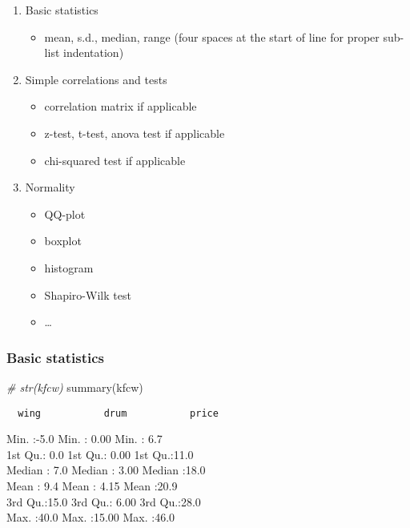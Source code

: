 \documentclass[
]{article}
\newenvironment{Shaded}{\begin{snugshade}}{\end{snugshade}}
\newcommand{\CommentTok}[1]{\textcolor[rgb]{0.56,0.35,0.01}{\textit{#1}}}
\newcommand{\FunctionTok}[1]{\textcolor[rgb]{0.00,0.00,0.00}{#1}}
\newcommand{\NormalTok}[1]{#1}
\providecommand{\tightlist}{%
  \setlength{\itemsep}{0pt}\setlength{\parskip}{0pt}}
\begin{document}
\begin{enumerate}
\def\labelenumi{\arabic{enumi}.}
\tightlist
\item
  Basic statistics

  \begin{itemize}
  \tightlist
  \item
    mean, s.d., median, range (four spaces at the start of line for
    proper sub-list indentation)
  \end{itemize}
\item
  Simple correlations and tests

  \begin{itemize}
  \tightlist
  \item
    correlation matrix if applicable
  \item
    z-test, t-test, anova test if applicable
  \item
    chi-squared test if applicable
  \end{itemize}
\item
  Normality

  \begin{itemize}
  \tightlist
  \item
    QQ-plot
  \item
    boxplot
  \item
    histogram
  \item
    Shapiro-Wilk test
  \item
    \ldots{}
  \end{itemize}
\end{enumerate}

\hypertarget{basic-statistics}{%
\subsubsection{Basic statistics}\label{basic-statistics}}

\begin{Shaded}
\begin{Highlighting}[]
\CommentTok{\# str(kfcw)}
\FunctionTok{summary}\NormalTok{(kfcw)}
\end{Highlighting}
\end{Shaded}

\begin{verbatim}
  wing           drum           price     
\end{verbatim}

Min. :-5.0 Min. : 0.00 Min. : 6.7\\
1st Qu.: 0.0 1st Qu.: 0.00 1st Qu.:11.0\\
Median : 7.0 Median : 3.00 Median :18.0\\
Mean : 9.4 Mean : 4.15 Mean :20.9\\
3rd Qu.:15.0 3rd Qu.: 6.00 3rd Qu.:28.0\\
Max. :40.0 Max. :15.00 Max. :46.0
\end{document}
